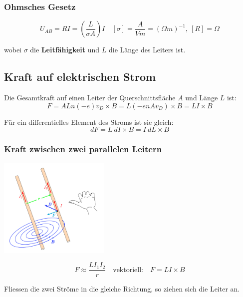 \documentclass[7pt]{article}
\begin{document}
\begin{multicols*}{3}
\subsubsection{Ohmsches Gesetz}

\begin{equation*}
	U_{AB} = RI = (\frac{L}{\sigma A})I \quad [\sigma] = \frac{A}{Vm} = (\Omega m)^{-1},\ [R] = \Omega
\end{equation*}

wobei $\sigma$ die \textbf{Leitf{\"a}higkeit} und $L$ die L{\"a}nge des Leiters ist.

\subsection{Kraft auf elektrischen Strom}

Die Gesamtkraft auf einen Leiter der Querschnittsfl{\"a}che $A$ und L{\"a}nge $L$ ist:
\begin{equation*}
	F = ALn(-e)v_D \times B = L(-enAv_D)\times B = LI \times B
\end{equation*}

F{\"u}r ein differentielles Element des Stroms ist sie gleich:
\begin{equation*}
	dF = L\ dI \times B = I\ dL\times B
\end{equation*}

\subsubsection{Kraft zwischen zwei parallelen Leitern}

\begin{center}
	\includegraphics[width=150pt]{images/parallele_leiter}
\end{center}

\begin{equation*}
	F \approx \frac{LI_1I_2}{r} \quad \text{vektoriell:}\quad F = LI \times B
\end{equation*}

Fliessen die zwei Str{\"o}me in die gleiche Richtung, so ziehen sich die Leiter an.


\end{multicols*}
\end{document}
